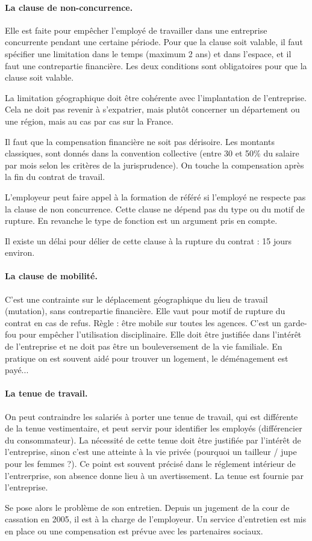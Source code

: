 	\paragraph{La clause de non-concurrence.}
	Elle est faite pour empêcher l’employé de travailler dans une entreprise concurrente pendant une certaine période.
	Pour que la clause soit valable, il faut spécifier une limitation dans le temps (maximum 2 ans) et dans l’espace, et il faut une contrepartie financière.
	Les deux conditions sont obligatoires pour que la clause soit valable.
	
	La limitation géographique doit être cohérente avec l'implantation de l'entreprise.
	Cela ne doit pas revenir à s'expatrier, mais plutôt concerner un département ou une région, mais au cas par cas sur la France.
	
	Il faut que la compensation financière ne soit pas dérisoire.
	Les montants classiques, sont donnés dans la convention collective (entre 30 et 50\% du salaire par mois selon les critères de la jurisprudence).
	On touche la compensation après la fin du contrat de travail.
	
	L’employeur peut faire appel à la formation de référé si l’employé ne respecte pas la clause de non concurrence.
	Cette clause ne dépend pas du type ou du motif de rupture.
	En revanche le type de fonction est un argument pris en compte.
	
	Il existe un délai pour délier de cette clause à la rupture du contrat : 15 jours environ.
	
	\paragraph{La clause de mobilité.}
	C'est une contrainte sur le déplacement géographique du lieu de travail (mutation), sans contrepartie financière.
	Elle vaut pour motif de rupture du contrat en cas de refus.
	Règle : être mobile sur toutes les agences.
	C'est un garde-fou pour empêcher l'utilisation disciplinaire.
	Elle doit être justifiée dans l'intérêt de l'entreprise et ne doit pas être un bouleversement de la vie familiale.
	En pratique on est souvent aidé pour trouver un logement, le déménagement est payé...
	
	\paragraph{La tenue de travail.}
	On peut contraindre les salariés à porter une tenue de travail, qui est différente de la tenue vestimentaire, et peut servir pour identifier les employés (différencier du consommateur).
	La nécessité de cette tenue doit être justifiée par l'intérêt de l'entreprise, sinon c'est une atteinte à la vie privée (pourquoi un tailleur / jupe pour les femmes ?).
	Ce point est souvent précisé dans le réglement intérieur de l'entrerprise, son absence donne lieu à un avertissement.
	La tenue est fournie par l'entreprise.
	
	Se pose alors le problème de son entretien.
	Depuis un jugement de la cour de cassation en 2005, il est à la charge de l'employeur.
	Un service d'entretien est mis en place ou une compensation est prévue avec les partenaires sociaux.
